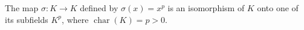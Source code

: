 The map $\sigma: K \to K$ defined by $\sigma(x) = x^p$ is an isomorphism of $K$ onto one of its subfields $K^p$, where $\operatorname{char}(K) = p > 0$.
